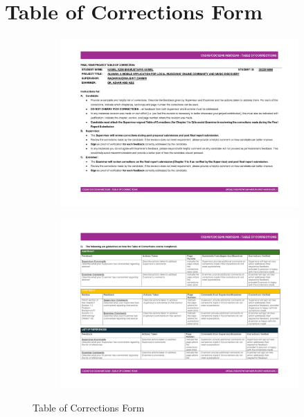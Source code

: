 \chapter{Table of Corrections Form}
\begin{figure}[h]
    \centering
    \begin{subfigure}[b]{0.9\textwidth}
        \centering
        \includegraphics[width=\textwidth]{appendices/forms/toc1.jpg}
        \label{fig:sub1}
    \end{subfigure}
    \hspace{0.03\textwidth}
    \begin{subfigure}[b]{0.9\textwidth}
        \centering
        \includegraphics[width=\textwidth]{appendices/forms/toc2.jpg}
        \label{fig:sub2}
    \end{subfigure}
    \caption{Table of Corrections Form}
    \label{fig:myfig90}
\end{figure}
